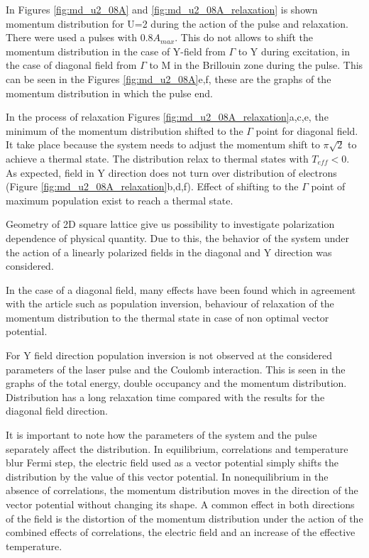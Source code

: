 In Figures \ref{fig:md_u2_08A} and \ref{fig:md_u2_08A_relaxation} is shown momentum distribution for U=2 during the action of the pulse and relaxation. There were used a pulses with $0.8A_{max}$. This do not allows to shift the momentum distribution in the case of Y-field from $\Gamma$ to Y during excitation, in the case of diagonal field from $\Gamma$ to M in the Brillouin zone during the pulse. This can be seen in the Figures \ref{fig:md_u2_08A}e,f, these are the graphs of the momentum distribution in which the pulse end.

In the process of relaxation Figures \ref{fig:md_u2_08A_relaxation}a,c,e, the minimum of the momentum distribution shifted to the $\Gamma$ point for diagonal field. It take place because the system needs to adjust the momentum shift to $\pi\sqrt{2}$ to achieve a thermal state. The distribution relax to thermal states with $T_{eff} < 0$.
As expected, field in Y direction does not turn over distribution of electrons (Figure \ref{fig:md_u2_08A_relaxation}b,d,f). Effect of shifting to the $\Gamma$ point of maximum population exist to reach a thermal state.


Geometry of 2D square lattice give us possibility to investigate polarization dependence of physical quantity. Due to this, the behavior of the system under the action of a linearly polarized fields in the diagonal and Y direction was considered.

In the case of a diagonal field, many effects have been found which in agreement with the article \citet{PhysRevB.85.155124} such as population inversion, behaviour of relaxation of the momentum distribution to the thermal state in case of non optimal vector potential. 

For Y field direction population inversion is not observed at the considered parameters of the laser pulse and the Coulomb interaction. This is seen in the graphs of the total energy, double occupancy and the momentum distribution. Distribution has a long relaxation time compared with the results for the diagonal field direction. 

It is important to note how the parameters of the system and the pulse separately affect the distribution. In equilibrium, correlations and temperature blur Fermi step, the electric field used as a vector potential simply shifts the distribution by the value of this vector potential. In nonequilibrium in the absence of correlations, the momentum distribution moves in the direction of the vector potential without changing its shape. 
A common effect in both directions of the field is the distortion of the momentum distribution under the action of the combined effects of correlations, the electric field and an increase of the effective temperature.

